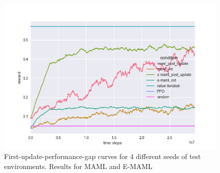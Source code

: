 \begin{figure}[H]
\begin{center}
\includegraphics[scale=0.335]{bradly_curves/gap_grids_maml_4.png}
\end{center}
\caption{First-update-performance-gap curves for 4 different seeds of test environments. Results for MAML and E-MAML}
\label{fig:appendix-gap-curves-0}
\end{figure} 

